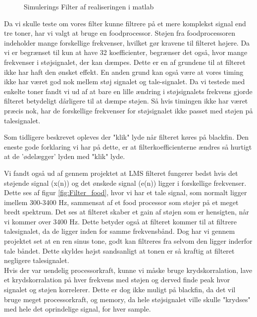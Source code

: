 \begin{description}[align=left]
\begin{figure}[H]
	\caption{Simulerings Filter af realiseringen i matlab}
	\label{fig:filter_matlab}
\end{figure}
\item [Food processor realisering] Da vi skulle teste om vores filter kunne filtrere på et mere komplekst signal end tre toner, har vi valgt at bruge en foodprocessor. Støjen fra foodprocessoren indeholder mange forskellige frekvenser, hvilket gør kravene til filteret højere. Da vi er begrænset til kun at have 32 koefficienter, begrænser det også, hvor mange frekvenser i støjsignalet, der kan dæmpes. Dette er en af grundene til at filteret ikke har haft den ønsket effekt. 
En anden grund kan også være at vores timing ikke har været god nok mellem støj signalet og tale-signalet. Da vi testede med enkelte toner fandt vi ud af at bare en lille ændring i støjsignalets frekvens gjorde filteret betydeligt dårligere til at dæmpe støjen. Så hvis timingen ikke har været præcis nok, har de forskellige frekvenser for støjsignalet ikke passet med støjen på talesignalet.
\item ["klik" lyde.] Som tidligere beskrevet opleves der "klik" lyde når filteret køres på blackfin. Den eneste gode forklaring vi har på dette, er at filterkoefficienterne ændres så hurtigt at de 'ødelægger' lyden med "klik" lyde. 
\item [Bedst udenfor 300-3400 Hz.] Vi fandt også ud af gennem projektet at LMS filteret fungerer bedst hvis det støjende signal (x(n)) og det ønskede signal (e(n)) ligger i forskellige frekvenser. Dette ses af figur \ref{fig:Filter_food}, hvor vi har et tale signal, som normalt ligger imellem 300-3400 Hz, sammensat af et food processor som støjer på et meget bredt spektrum. Det ses at filteret skaber et gain af støjen som er hensigten, når vi kommer over 3400 Hz. Dette betyder også at filteret kommer til at filtrere talesignalet, da de ligger inden for samme frekvensbånd. Dog har vi gennem projektet set at en ren sinus tone, godt kan filtreres fra selvom den ligger inderfor tale båndet. Dette skyldes højst sandsanligt at tonen er så kraftig at filteret negligere talesignalet. \\
Hvis der var uendelig processorkraft, kunne vi måske bruge krydskorralation, lave et krydskorralation på hver frekvens med støjen og derved finde peak hvor signalet og støjen korrelerer. Dette er dog ikke muligt på blackfin, da det vil bruge meget processorkraft, og memory, da hele støjsignalet ville skulle "krydses" med hele det oprindelige signal, for hver sample. 
\item [Ikke-funktionelle krav.]

\end{description}
